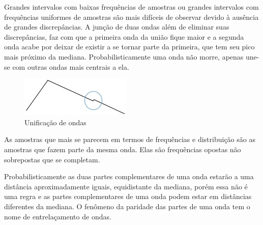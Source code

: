 Grandes intervalos com baixas frequências de amostras ou grandes intervalos com frequências uniformes de amostras são mais difíceis de observar devido à ausência de grandes discrepâncias. A junção de duas ondas além de eliminar suas discrepâncias, faz com que a primeira onda da união fique maior e a segunda onda acabe por deixar de existir a se tornar parte da primeira, que tem seu pico mais próximo da mediana. Probabilisticamente uma onda não morre, apenas une-se com outras ondas mais centrais a ela.
	\begin{figure}[H]
	\caption{Unificação de ondas}
	\label{fig:consciousness_uniform_wave}
	\centering
	\includegraphics[scale=1]{sections/images/consciousness_uniform_wave.jpg}
	\end{figure}

As amostras que mais se parecem em termos de frequências e distribuição são as amostras que fazem parte da mesma onda. Elas são frequências opostas não sobrepostas que se completam.

Probabilisticamente as duas partes complementares de uma onda estarão a uma distância aproximadamente iguais, equidistante da mediana, porém essa não é uma regra e as partes complementares de uma onda podem estar em distâncias diferentes da mediana. O fenômeno da paridade das partes de uma onda tem o nome de entrelaçamento de ondas.

